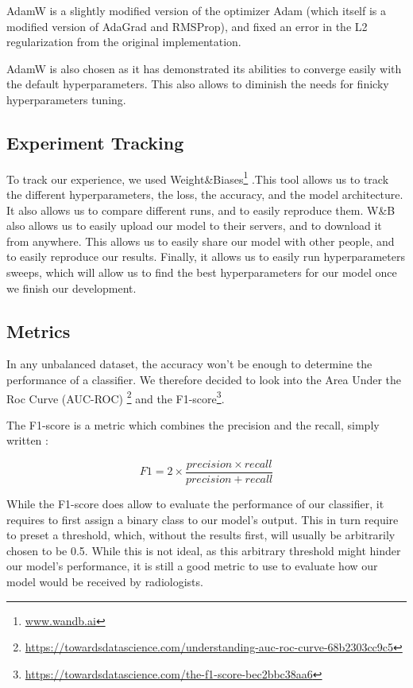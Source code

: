 \documentclass[11pt]{article}
\begin{document}
        AdamW is a slightly modified version of the optimizer Adam (which itself is a modified version of AdaGrad and RMSProp), and fixed an error in the L2 regularization from the original implementation.

        AdamW is also chosen as it has demonstrated its abilities to converge easily with the default hyperparameters. This also allows to diminish the needs for finicky hyperparameters tuning.


    \subsection{Experiment Tracking}

        To track our experience, we used Weight\&Biases\footnote{\url{www.wandb.ai}} .This tool allows us to track the different hyperparameters,
        the loss, the accuracy, and the model architecture. It also allows us to compare different runs, and to easily reproduce them.
        W\&B also allows us to easily upload our model to their servers, and to download it from anywhere. This
        allows us to easily share our model with other people, and to easily reproduce our results. Finally, it allows us
        to easily run hyperparameters sweeps, which will allow us to find the best hyperparameters for our model once we
        finish our development.

    \subsection{Metrics}
        In any unbalanced dataset, the accuracy won't be enough to determine the performance of a classifier.
        We therefore decided to look into the Area Under the Roc Curve (AUC-ROC) \footnote{\url{https://towardsdatascience.com/understanding-auc-roc-curve-68b2303cc9c5}}
        and the F1-score\footnote{\url{https://towardsdatascience.com/the-f1-score-bec2bbc38aa6}}.


        The F1-score is a metric which combines the precision and the recall, simply written :

        \begin{equation}
            F1 = 2 \times \frac{precision \times recall}{precision + recall}
        \end{equation}

        While the F1-score does allow to evaluate the performance of our classifier, it requires to first assign a
        binary class to our model's output. This in turn require to preset a threshold, which, without the results first, will usually be arbitrarily
        chosen to be 0.5. While this is not ideal, as this arbitrary threshold might hinder our model's performance,
        it is still a good metric to use to evaluate how our model would be received by radiologists.
\end{document}
